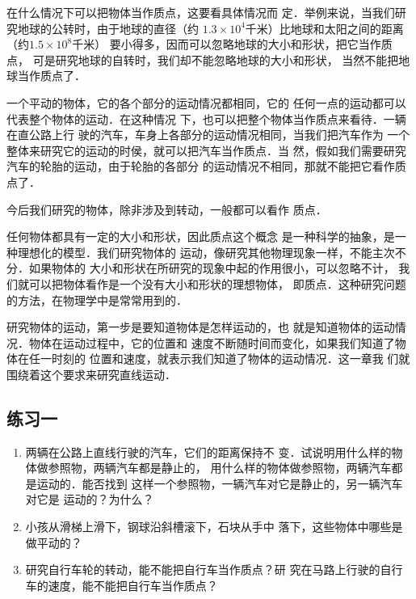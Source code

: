     在什么情况下可以把物体当作质点，这要看具体情况而
定．举例来说，当我们研究地球的公转时，由于地球的直径（约
$1.3\times 10^4$千米）比地球和太阳之间的距离（约$1.5\times 10^8$千米）
要小得多，因而可以忽略地球的大小和形状，把它当作质点，
可是研究地球的自转时，我们却不能忽略地球的大小和形状，
当然不能把地球当作质点了．

    一个平动的物体，它的各个部分的运动情况都相同，它的
任何一点的运动都可以代表整个物体的运动．在这种情况
下，也可以把整个物体当作质点来看待．一辆在直公路上行
驶的汽车，车身上各部分的运动情况相同，当我们把汽车作为
一个整体来研究它的运动的时侯，就可以把汽车当作质点．当
然，假如我们需要研究汽车的轮胎的运动，由于轮胎的各部分
的运动情况不相同，那就不能把它看作质点了．

    今后我们研究的物体，除非涉及到转动，一般都可以看作
质点．

    任何物体都具有一定的大小和形状，因此质点这个概念
是一种科学的抽象，是一种理想化的模型．我们研究物体的
运动，像研究其他物理现象一样，不能主次不分．如果物体的
大小和形状在所研究的现象中起的作用很小，可以忽略不计，
我们就可以把物体看作是一个没有大小和形状的理想物体，
即质点．这种研究问题的方法，在物理学中是常常用到的．

    研究物体的运动，第一步是要知道物体是怎样运动的，也
就是知道物体的运动情况．物体在运动过程中，它的位置和
速度不断随时间而变化，如果我们知道了物体在任一时刻的
位置和速度，就表示我们知道了物体的运动情况．这一章我
们就围绕着这个要求来研究直线运动．

 \subsection*{练习一}
\begin{enumerate}
\item 两辆在公路上直线行驶的汽车，它们的距离保持不
变．试说明用什么样的物体做参照物，两辆汽车都是静止的，
用什么样的物体做参照物，两辆汽车都是运动的．能否找到
这样一个参照物，一辆汽车对它是静止的，另一辆汽车对它是
运动的？为什么？

\item 小孩从滑梯上滑下，钢球沿斜槽滚下，石块从手中
落下，这些物体中哪些是做平动的？

\item 研究自行车轮的转动，能不能把自行车当作质点？研
究在马路上行驶的自行车的速度，能不能把自行车当作质点？
\end{enumerate}

